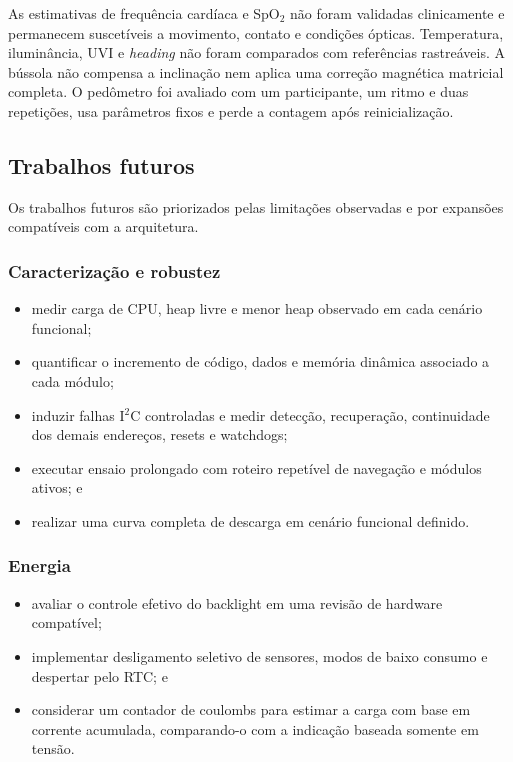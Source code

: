 \documentclass[a4paper,12pt]{article}
\begin{document}
As estimativas de frequ\^encia card\'iaca e SpO$_2$ n\~ao foram validadas clinicamente e permanecem suscet\'iveis a movimento, contato e condi\c{c}\~oes \'opticas. Temperatura, ilumin\^ancia, UVI e \emph{heading} n\~ao foram comparados com refer\^encias rastre\'aveis. A b\'ussola n\~ao compensa a inclina\c{c}\~ao nem aplica uma corre\c{c}\~ao magn\'etica matricial completa. O ped\^ometro foi avaliado com um participante, um ritmo e duas repeti\c{c}\~oes, usa par\^ametros fixos e perde a contagem ap\'os reinicializa\c{c}\~ao.


\subsection{Trabalhos futuros}


Os trabalhos futuros s\~ao priorizados pelas limita\c{c}\~oes observadas e por expans\~oes compat\'iveis com a arquitetura.


\subsubsection{Caracteriza\c{c}\~ao e robustez}


\begin{itemize}
    \item medir carga de CPU, heap livre e menor heap observado em cada cen\'ario funcional;
    \item quantificar o incremento de c\'odigo, dados e mem\'oria din\^amica associado a cada m\'odulo;
    \item induzir falhas I$^2$C controladas e medir detec\c{c}\~ao, recupera\c{c}\~ao, continuidade dos demais endere\c{c}os, resets e watchdogs;
    \item executar ensaio prolongado com roteiro repet\'ivel de navega\c{c}\~ao e m\'odulos ativos; e
    \item realizar uma curva completa de descarga em cen\'ario funcional definido.
\end{itemize}


\subsubsection{Energia}


\begin{itemize}
    \item avaliar o controle efetivo do backlight em uma revis\~ao de hardware compat\'ivel;
    \item implementar desligamento seletivo de sensores, modos de baixo consumo e despertar pelo RTC; e
    \item considerar um contador de coulombs para estimar a carga com base em corrente acumulada, comparando-o com a indica\c{c}\~ao baseada somente em tens\~ao.
\end{itemize}
\end{document}
